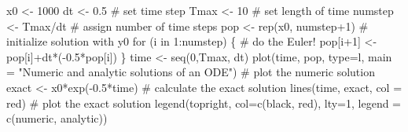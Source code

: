 \documentclass[
  letterpaper,
  DIV=11,
  numbers=noendperiod]{scrreprt}
\newenvironment{Shaded}{\begin{snugshade}}{\end{snugshade}}
\newcommand{\AttributeTok}[1]{\textcolor[rgb]{0.40,0.45,0.13}{#1}}
\newcommand{\CommentTok}[1]{\textcolor[rgb]{0.37,0.37,0.37}{#1}}
\newcommand{\ControlFlowTok}[1]{\textcolor[rgb]{0.00,0.23,0.31}{#1}}
\newcommand{\DecValTok}[1]{\textcolor[rgb]{0.68,0.00,0.00}{#1}}
\newcommand{\FloatTok}[1]{\textcolor[rgb]{0.68,0.00,0.00}{#1}}
\newcommand{\FunctionTok}[1]{\textcolor[rgb]{0.28,0.35,0.67}{#1}}
\newcommand{\NormalTok}[1]{\textcolor[rgb]{0.00,0.23,0.31}{#1}}
\newcommand{\OtherTok}[1]{\textcolor[rgb]{0.00,0.23,0.31}{#1}}
\newcommand{\SpecialCharTok}[1]{\textcolor[rgb]{0.37,0.37,0.37}{#1}}
\newcommand{\StringTok}[1]{\textcolor[rgb]{0.13,0.47,0.30}{#1}}
\begin{document}
\begin{Shaded}
\begin{Highlighting}[]
\NormalTok{x0 }\OtherTok{\textless{}{-}} \DecValTok{1000}
\NormalTok{dt }\OtherTok{\textless{}{-}} \FloatTok{0.5} \CommentTok{\# set time step}
\NormalTok{Tmax }\OtherTok{\textless{}{-}} \DecValTok{10} \CommentTok{\# set length of time}
\NormalTok{numstep }\OtherTok{\textless{}{-}}\NormalTok{ Tmax}\SpecialCharTok{/}\NormalTok{dt }\CommentTok{\# assign number of time steps}
\NormalTok{pop }\OtherTok{\textless{}{-}} \FunctionTok{rep}\NormalTok{(x0, numstep}\SpecialCharTok{+}\DecValTok{1}\NormalTok{) }\CommentTok{\# initialize solution with y0}
\ControlFlowTok{for}\NormalTok{ (i }\ControlFlowTok{in} \DecValTok{1}\SpecialCharTok{:}\NormalTok{numstep) \{ }\CommentTok{\# do the Euler!}
\NormalTok{    pop[i}\SpecialCharTok{+}\DecValTok{1}\NormalTok{] }\OtherTok{\textless{}{-}}\NormalTok{ pop[i]}\SpecialCharTok{+}\NormalTok{dt}\SpecialCharTok{*}\NormalTok{(}\SpecialCharTok{{-}}\FloatTok{0.5}\SpecialCharTok{*}\NormalTok{pop[i])}
\NormalTok{\}}
\NormalTok{time }\OtherTok{\textless{}{-}} \FunctionTok{seq}\NormalTok{(}\DecValTok{0}\NormalTok{,Tmax, dt)}
\FunctionTok{plot}\NormalTok{(time, pop, }\AttributeTok{type=}\StringTok{\textquotesingle{}l\textquotesingle{}}\NormalTok{, }\AttributeTok{main =} \StringTok{"Numeric and analytic solutions of an ODE"}\NormalTok{) }\CommentTok{\# plot the numeric solution}
\NormalTok{exact }\OtherTok{\textless{}{-}}\NormalTok{ x0}\SpecialCharTok{*}\FunctionTok{exp}\NormalTok{(}\SpecialCharTok{{-}}\FloatTok{0.5}\SpecialCharTok{*}\NormalTok{time) }\CommentTok{\# calculate the exact solution}
\FunctionTok{lines}\NormalTok{(time, exact, }\AttributeTok{col =} \StringTok{\textquotesingle{}red\textquotesingle{}}\NormalTok{) }\CommentTok{\# plot the exact solution}
\FunctionTok{legend}\NormalTok{(}\StringTok{\textquotesingle{}topright\textquotesingle{}}\NormalTok{, }\AttributeTok{col=}\FunctionTok{c}\NormalTok{(}\StringTok{\textquotesingle{}black\textquotesingle{}}\NormalTok{, }\StringTok{\textquotesingle{}red\textquotesingle{}}\NormalTok{), }\AttributeTok{lty=}\DecValTok{1}\NormalTok{, }\AttributeTok{legend =} \FunctionTok{c}\NormalTok{(}\StringTok{\textquotesingle{}numeric\textquotesingle{}}\NormalTok{, }\StringTok{\textquotesingle{}analytic\textquotesingle{}}\NormalTok{))}
\end{Highlighting}
\end{Shaded}
\end{document}
